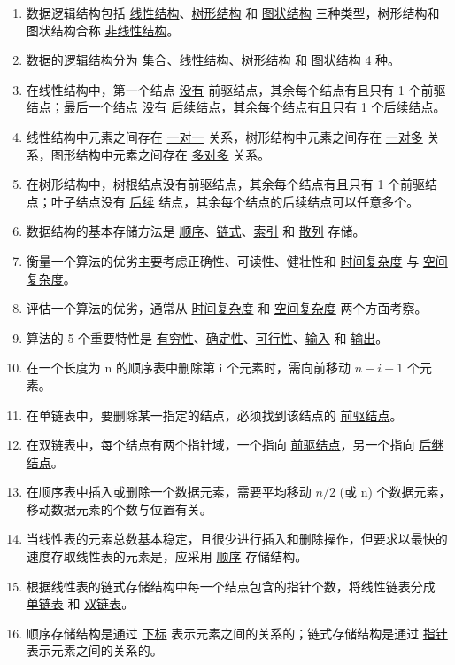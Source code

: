\documentclass[12pt, a4paper]{article}
\begin{document}
\begin{enumerate}
    \item 数据逻辑结构包括 \underline{线性结构}、\underline{树形结构} 和 \underline{图状结构} 三种类型，树形结构和图状结构合称 \underline{非线性结构}。
    \item 数据的逻辑结构分为 \underline{集合}、\underline{线性结构}、\underline{树形结构} 和 \underline{图状结构} 4 种。
    \item 在线性结构中，第一个结点 \underline{没有} 前驱结点，其余每个结点有且只有 1 个前驱结点；最后一个结点 \underline{没有} 后续结点，其余每个结点有且只有 1 个后续结点。
    \item 线性结构中元素之间存在 \underline{一对一} 关系，树形结构中元素之间存在 \underline{一对多} 关系，图形结构中元素之间存在 \underline{多对多} 关系。
    \item 在树形结构中，树根结点没有前驱结点，其余每个结点有且只有 1 个前驱结点；叶子结点没有 \underline{后续} 结点，其余每个结点的后续结点可以任意多个。
    \item 数据结构的基本存储方法是 \underline{顺序}、\underline{链式}、\underline{索引} 和 \underline{散列} 存储。
    \item 衡量一个算法的优劣主要考虑正确性、可读性、健壮性和 \underline{时间复杂度} 与 \underline{空间复杂度}。
    \item 评估一个算法的优劣，通常从 \underline{时间复杂度} 和 \underline{空间复杂度} 两个方面考察。
    \item 算法的 5 个重要特性是 \underline{有穷性}、\underline{确定性}、\underline{可行性}、\underline{输入} 和 \underline{输出}。
    \item 在一个长度为 n 的顺序表中删除第 i 个元素时，需向前移动 \underline{$n-i-1$} 个元素。
    \item 在单链表中，要删除某一指定的结点，必须找到该结点的 \underline{前驱结点}。
    \item 在双链表中，每个结点有两个指针域，一个指向 \underline{前驱结点}，另一个指向 \underline{后继结点}。
    \item 在顺序表中插入或删除一个数据元素，需要平均移动 \underline{$n/2$} (或 n) 个数据元素，移动数据元素的个数与位置有关。
    \item 当线性表的元素总数基本稳定，且很少进行插入和删除操作，但要求以最快的速度存取线性表的元素是，应采用 \underline{顺序} 存储结构。
    \item 根据线性表的链式存储结构中每一个结点包含的指针个数，将线性链表分成 \underline{单链表} 和 \underline{双链表}。
    \item 顺序存储结构是通过 \underline{下标} 表示元素之间的关系的；链式存储结构是通过 \underline{指针} 表示元素之间的关系的。

\end{enumerate}
\end{document}

